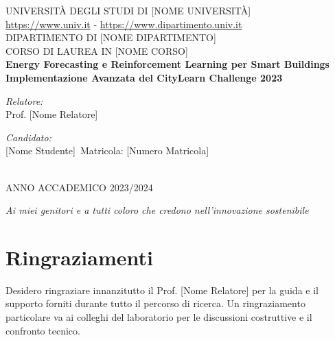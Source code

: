 \documentclass[12pt,a4paper,twoside]{report}
\begin{document}
\begin{titlepage}
\centering
{\Large UNIVERSITÀ DEGLI STUDI DI [NOME UNIVERSITÀ]}\\[0.5cm]
{\small \url{https://www.univ.it} - \url{https://www.dipartimento.univ.it}}\\[0.5cm]
{\Large DIPARTIMENTO DI [NOME DIPARTIMENTO]}\\[0.5cm]
{\Large CORSO DI LAUREA IN [NOME CORSO]}\\[2cm]

{\huge\bfseries Energy Forecasting e Reinforcement Learning per Smart Buildings}\\[0.5cm]
{\Large\bfseries Implementazione Avanzata del CityLearn Challenge 2023}\\[3cm]

\begin{minipage}{0.4\textwidth}
\begin{flushleft} \large
\emph{Relatore:}\\
Prof. [Nome Relatore]
\end{flushleft}
\end{minipage}%
\begin{minipage}{0.4\textwidth}
\begin{flushright} \large
\emph{Candidato:} \\
{[Nome Studente]}\
Matricola: [Numero Matricola]
\end{flushright}
\end{minipage}\\[3cm]

{\large ANNO ACCADEMICO 2023/2024}

\end{titlepage}


\newpage
\thispagestyle{empty}
\begin{center}
\emph{Ai miei genitori e a tutti coloro che credono nell'innovazione sostenibile}
\end{center}

\chapter*{Ringraziamenti}

Desidero ringraziare innanzitutto il Prof. [Nome Relatore] per la guida e il supporto forniti durante tutto il percorso di ricerca. Un ringraziamento particolare va ai colleghi del laboratorio per le discussioni costruttive e il confronto tecnico.
\end{document}
